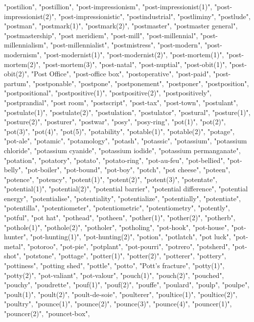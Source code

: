 "postilion",
"postillion",
"post-impressionism",
"post-impressionist(1)",
"post-impressionist(2)",
"post-impressionistic",
"postindustrial",
"postliminy",
"postlude",
"postman",
"postmark(1)",
"postmark(2)",
"postmaster",
"postmaster general",
"postmastership",
"post meridiem",
"post-mill",
"post-millennial",
"post-millennialism",
"post-millennialist",
"postmistress",
"post-modern",
"post-modernism",
"post-modernist(1)",
"post-modernist(2)",
"post-mortem(1)",
"post-mortem(2)",
"post-mortem(3)",
"post-natal",
"post-nuptial",
"post-obit(1)",
"post-obit(2)",
"Post Office",
"post-office box",
"postoperative",
"post-paid",
"post-partum",
"postponable",
"postpone",
"postponement",
"postponer",
"postposition",
"postpositional",
"postpositive(1)",
"postpositive(2)",
"postpositively",
"postprandial",
"post room",
"postscript",
"post-tax",
"post-town",
"postulant",
"postulate(1)",
"postulate(2)",
"postulation",
"postulator",
"postural",
"posture(1)",
"posture(2)",
"posturer",
"postwar",
"posy",
"posy-ring",
"pot(1)",
"pot(2)",
"pot(3)",
"pot(4)",
"pot(5)",
"potability",
"potable(1)",
"potable(2)",
"potage",
"pot-ale",
"potamic",
"potamology",
"potash",
"potassic",
"potassium",
"potassium chloride",
"potassium cyanide",
"potassium iodide",
"potassium permanganate",
"potation",
"potatory",
"potato",
"potato-ring",
"pot-au-feu",
"pot-bellied",
"pot-belly",
"pot-boiler",
"pot-bound",
"pot-boy",
"potch",
"pot cheese",
"poteen",
"potence",
"potency",
"potent(1)",
"potent(2)",
"potent(3)",
"potentate",
"potential(1)",
"potential(2)",
"potential barrier",
"potential difference",
"potential energy",
"potentialise",
"potentiality",
"potentialize",
"potentially",
"potentiate",
"potentilla",
"potentiometer",
"potentiometric",
"potentiometry",
"potently",
"potful",
"pot hat",
"pothead",
"potheen",
"pother(1)",
"pother(2)",
"potherb",
"pothole(1)",
"pothole(2)",
"potholer",
"potholing",
"pot-hook",
"pot-house",
"pot-hunter",
"pot-hunting(1)",
"pot-hunting(2)",
"potion",
"potlatch",
"pot luck",
"pot-metal",
"potoroo",
"pot-pie",
"potplant",
"pot-pourri",
"potrero",
"potsherd",
"pot-shot",
"potstone",
"pottage",
"potter(1)",
"potter(2)",
"potterer",
"pottery",
"pottiness",
"potting shed",
"pottle",
"potto",
"Pott's fracture",
"potty(1)",
"potty(2)",
"pot-valiant",
"pot-valour",
"pouch(1)",
"pouch(2)",
"pouched",
"pouchy",
"poudrette",
"pouf(1)",
"pouf(2)",
"pouffe",
"poulard",
"poulp",
"poulpe",
"poult(1)",
"poult(2)",
"poult-de-soie",
"poulterer",
"poultice(1)",
"poultice(2)",
"poultry",
"pounce(1)",
"pounce(2)",
"pounce(3)",
"pounce(4)",
"pouncer(1)",
"pouncer(2)",
"pouncet-box",
